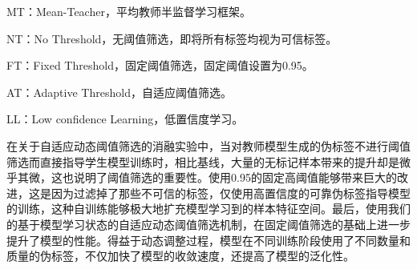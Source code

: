 \documentclass[lang=chs, degree=master, blindreview=false, adobe=false]{yanputhesis}
\begin{document}
MT：Mean-Teacher，平均教师半监督学习框架。

NT：No Threshold，无阈值筛选，即将所有标签均视为可信标签。

FT：Fixed Threshold，固定阈值筛选，固定阈值设置为0.95。

AT：Adaptive Threshold，自适应阈值筛选。

LL：Low confidence Learning，低置信度学习。

在关于自适应动态阈值筛选的消融实验中，当对教师模型生成的伪标签不进行阈值筛选而直接指导学生模型训练时，相比基线，大量的无标记样本带来的提升却是微乎其微，这也说明了阈值筛选的重要性。使用0.95的固定高阈值能够带来巨大的改进，这是因为过滤掉了那些不可信的标签，仅使用高置信度的可靠伪标签指导模型的训练，这种自训练能够极大地扩充模型学习到的样本特征空间。最后，使用我们的基于模型学习状态的自适应动态阈值筛选机制，在固定阈值筛选的基础上进一步提升了模型的性能。得益于动态调整过程，模型在不同训练阶段使用了不同数量和质量的伪标签，不仅加快了模型的收敛速度，还提高了模型的泛化性。
\end{document}
